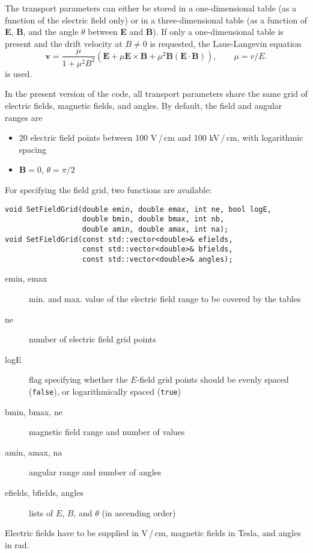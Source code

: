 The transport parameters can either be stored in a 
one-dimensional table (as a function of the electric field only) or 
in a three-dimensional table (as a function of \textbf{E}, \textbf{B}, 
and the angle \(\theta\) between \textbf{E} and \textbf{B}). 
If only a one-dimensional table is present and the 
drift velocity at \(B \ne 0\) is requested, the Laue-Langevin equation
\cite{BlumRieglerRolandi2008}
\begin{equation*}
  \mathbf{v} = \frac{\mu}{1 + \mu^2 B^2} \left(
  \mathbf{E} + \mu \mathbf{E} \times \mathbf{B} + 
  \mu^2 \mathbf{B} \left(\mathbf{E} \cdot \mathbf{B}\right)\right), \qquad 
  \mu = v / E. 
\end{equation*} 
is used. 

In the present version of the code,
all transport parameters share the same grid 
of electric fields, magnetic fields, and angles.
By default, the field and angular ranges are
\begin{itemize}
  \item
  20 electric field points between 100 V\,/\,cm and 100 kV\,/\,cm, 
  with logarithmic spacing
  \item
  \(\mathbf{B} = 0\), \(\theta = \pi / 2\)
\end{itemize}

For specifying the field grid, two functions are available:
\begin{lstlisting}
void SetFieldGrid(double emin, double emax, int ne, bool logE,
                  double bmin, double bmax, int nb,
                  double amin, double amax, int na);
void SetFieldGrid(const std::vector<double>& efields,
                  const std::vector<double>& bfields,
                  const std::vector<double>& angles);
\end{lstlisting}
\begin{description}
\item[emin, emax] min. and max. value of the electric field range to be covered by the tables
\item[ne] number of electric field grid points
\item[logE] flag specifying whether the \(E\)-field grid points should be 
evenly spaced (\texttt{false}), or logarithmically spaced (\texttt{true}) 
\item[bmin, bmax, ne] magnetic field range and number of values
\item[amin, amax, na] angular range and number of angles
\item[efields, bfields, angles] lists of \(E\), \(B\), and 
\(\theta\) (in ascending order)
\end{description}
Electric fields have to be supplied in V\,/\,cm, magnetic fields in Tesla, 
and angles in rad.

